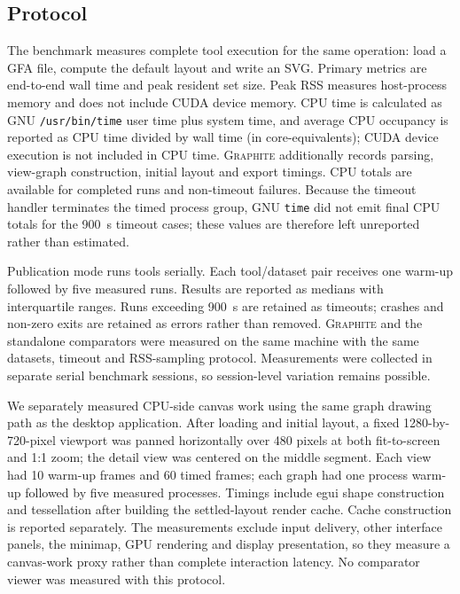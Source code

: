 \documentclass[11pt]{article}
\newcommand{\graphite}{\textsc{Graphite}\xspace}
\begin{document}
\subsection{Protocol}
The benchmark measures complete tool execution for the same operation: load a GFA file, compute the default layout and write an SVG. Primary metrics are end-to-end wall time and peak resident set size. Peak RSS measures host-process memory and does not include CUDA device memory. CPU time is calculated as GNU \texttt{/usr/bin/time} user time plus system time, and average CPU occupancy is reported as CPU time divided by wall time (in core-equivalents); CUDA device execution is not included in CPU time. \graphite additionally records parsing, view-graph construction, initial layout and export timings. CPU totals are available for completed runs and non-timeout failures. Because the timeout handler terminates the timed process group, GNU \texttt{time} did not emit final CPU totals for the 900~s timeout cases; these values are therefore left unreported rather than estimated.

Publication mode runs tools serially. Each tool/dataset pair receives one warm-up followed by five measured runs. Results are reported as medians with interquartile ranges. Runs exceeding 900~s are retained as timeouts; crashes and non-zero exits are retained as errors rather than removed. \graphite and the standalone comparators were measured on the same machine with the same datasets, timeout and RSS-sampling protocol. Measurements were collected in separate serial benchmark sessions, so session-level variation remains possible.

We separately measured CPU-side canvas work using the same graph drawing path as the desktop application. After loading and initial layout, a fixed 1280-by-720-pixel viewport was panned horizontally over 480 pixels at both fit-to-screen and 1:1 zoom; the detail view was centered on the middle segment. Each view had 10 warm-up frames and 60 timed frames; each graph had one process warm-up followed by five measured processes. Timings include egui shape construction and tessellation after building the settled-layout render cache. Cache construction is reported separately. The measurements exclude input delivery, other interface panels, the minimap, GPU rendering and display presentation, so they measure a canvas-work proxy rather than complete interaction latency. No comparator viewer was measured with this protocol.
\end{document}
